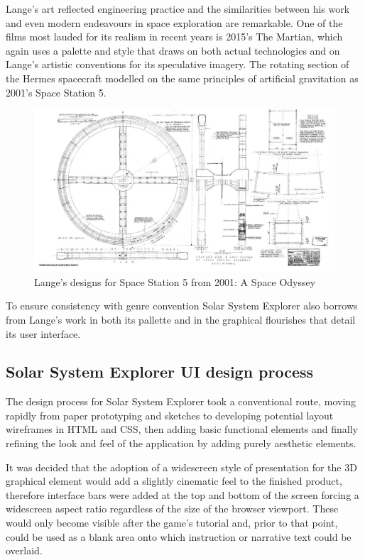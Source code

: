 \documentclass[twoside]{bhamthesis}
\begin{document}
Lange's art reflected engineering practice and the similarities between his work and even modern endeavours in space exploration are remarkable. One of the films most lauded for its realism in recent years is 2015's The Martian, which again uses a palette and style that draws on both actual technologies and on Lange's artistic conventions for its speculative imagery. The rotating section of the Hermes spacecraft modelled on the same principles of artificial gravitation as 2001's Space Station 5.

\begin{figure}[h!]
  \includegraphics[width=\linewidth]{images/spacestation.jpg}
  \caption{Lange's designs for Space Station 5 from 2001: A Space Odyssey {\cite{sinclair_man_2016}}}
  \label{fig:spacestation}
\end{figure}

To ensure consistency with genre convention Solar System Explorer also borrows from Lange's work in both its pallette and in the graphical flourishes that detail its user interface.

\subsection{Solar System Explorer UI design process}

The design process for Solar System Explorer took a conventional route, moving rapidly from paper prototyping and sketches to developing potential layout wireframes in HTML and CSS, then adding basic functional elements and finally refining the look and feel of the application by adding purely aesthetic elements.

It was decided that the adoption of a widescreen style of presentation for the 3D graphical element would add a slightly cinematic feel to the finished product, therefore interface bars were added at the top and bottom of the screen forcing a widescreen aspect ratio regardless of the size of the browser viewport. These would only become visible after the game's tutorial and, prior to that point, could be used as a blank area onto which instruction or narrative text could be overlaid.
\end{document}
